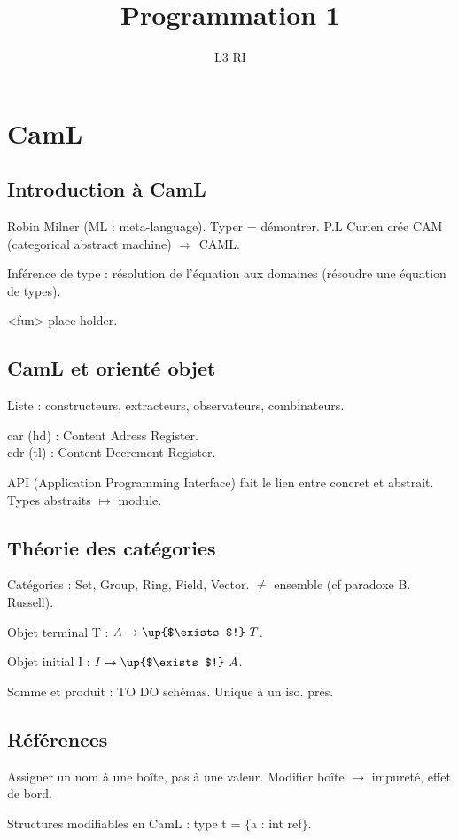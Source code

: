 \documentclass[french]{article}
\title{Programmation 1}
\date{}
\author{L3 RI}
\begin{document}
\maketitle
\tableofcontents
\newpage

\section{CamL}

\subsection{Introduction à CamL}
Robin Milner (ML : meta-language).
Typer = démontrer.
P.L Curien crée CAM (categorical abstract machine)
$\Rightarrow$ CAML.

Inférence de type : résolution de l'équation aux domaines (résoudre une équation de types).

<fun> place-holder.

\subsection{CamL et orienté objet}
Liste : constructeurs, extracteurs, observateurs, combinateurs.

car (hd) : Content Adress Register.\\
cdr (tl) : Content Decrement Register.

API (Application Programming Interface) fait le lien entre concret et abstrait. Types abstraits $\mapsto$ module.

\subsection{Théorie des catégories}
Catégories : Set, Group, Ring, Field, Vector. $\neq$ ensemble (cf paradoxe B. Russell).

Objet terminal T : $A \rightarrow\up{$\exists$!}\ T$.

Objet initial I : $I \rightarrow\up{$\exists$!}\ A$.

Somme et produit : TO DO schémas. Unique à un iso. près.

\subsection{Références}
Assigner un nom à une boîte, pas à une valeur. Modifier boîte $\rightarrow$ impureté, effet de bord.

Structures modifiables en CamL : type t = $\{$a : int ref$\}$.
\end{document}
